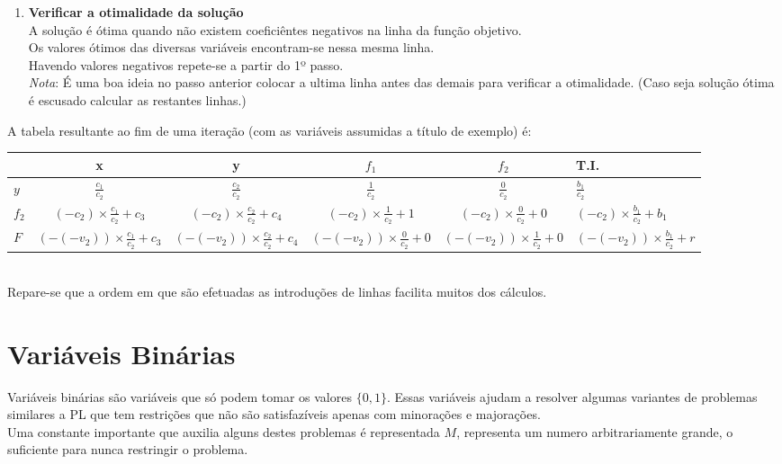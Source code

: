 \documentclass[]{report}
\begin{document}
\begin{enumerate}
\begin{itemize}
\end{itemize}
\item \textbf{Verificar a otimalidade da solução}\\
A solução é ótima quando não existem coeficiêntes negativos na linha da função objetivo.\\
Os valores ótimos das diversas variáveis encontram-se nessa mesma linha.\\
Havendo valores negativos repete-se a partir do 1º passo.\\
\textit{Nota}: É uma boa ideia no passo anterior colocar a ultima linha antes das demais para verificar a otimalidade. (Caso seja solução ótima é escusado calcular as restantes linhas.)
\end{enumerate}
A tabela resultante ao fim de uma iteração (com as variáveis assumidas a título de exemplo) é:\\
\begin{tabular}{l|cccc	|l}
      & x & y & $f_1$ & $f_2$ & T.I.\\\hline
$y$ & $\frac{c_1}{c_2}$ & $\frac{c_2}{c_2}$ & $\frac{1}{c_2}$ & $\frac{0}{c_2}$ & $\frac{b_1}{c_2}$\\
$f_2$ & $(-c_2) \times \frac{c_1}{c_2} + c_3 $ & $(-c_2) \times \frac{c_2}{c_2} + c_4$ & $(-c_2) \times \frac{1}{c_2} + 1$ & $(-c_2) \times \frac{0}{c_2} + 0$ & $(-c_2) \times \frac{b_1}{c_2} + b_1$\\\hline
$F$ & $(-(-v_2)) \times \frac{c_1}{c_2} + c_3 $ & $(-(-v_2)) \times \frac{c_2}{c_2} + c_4$ & $(-(-v_2)) \times \frac{0}{c_2} + 0$ & $(-(-v_2)) \times \frac{1}{c_2} + 0$ & $(-(-v_2)) \times \frac{b_1}{c_2} + r$
\end{tabular}\\
Repare-se que a ordem em que são efetuadas as introduções de linhas facilita muitos dos cálculos.
\section{Variáveis Binárias}
Variáveis binárias são variáveis que só podem tomar os valores $\{0,1\}$. Essas variáveis ajudam a resolver algumas variantes de problemas similares a PL que tem restrições que não são satisfazíveis apenas com minorações e majorações.\\
Uma constante importante que auxilia alguns destes problemas é representada $M$, representa um numero arbitrariamente grande, o suficiente para nunca restringir o problema.
\end{document}
